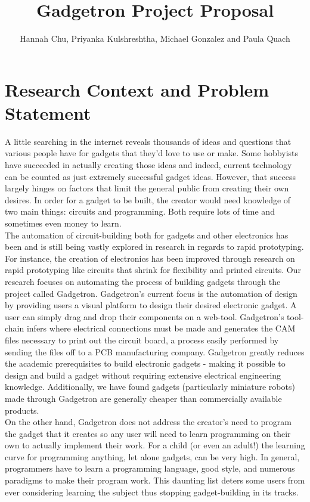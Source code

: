 \documentclass[12pt]{article}
\begin{document}
\author{Hannah Chu, Priyanka Kulshreshtha, Michael Gonzalez and Paula Quach}
\title{Gadgetron Project Proposal}
\maketitle

\section{Research Context and Problem Statement}
A little searching in the internet reveals thousands of ideas and questions that various people have for gadgets that they'd love to use or make. Some hobbyists have succeeded in actually creating those ideas and indeed, current technology can be counted as just extremely successful gadget ideas. However, that success largely hinges on factors that limit the general public from creating their own desires. In order for a gadget to be built, the creator would need knowledge of two main things: circuits and programming. Both require lots of time and sometimes even money to learn.\\[7pt]
The automation of circuit-building both for gadgets and other electronics has been and is still being vastly explored in research in regards to rapid prototyping. For instance, the creation of electronics has been improved through research on rapid prototyping like circuits that shrink for flexibility\cite{shrinky} and printed circuits\cite{inkjets}. Our research focuses on automating the process of building gadgets through the project called Gadgetron. Gadgetron's current focus is the automation of design by providing users a visual platform to design their desired electronic gadget. A user can simply drag and drop their components on a web-tool. Gadgetron's tool-chain infers where electrical connections must be made and generates the CAM files necessary to print out the circuit board, a process easily performed by sending the files off to a PCB manufacturing company. Gadgetron greatly reduces the academic prerequisites to build electronic gadgets - making it possible to design and build a gadget without requiring extensive electrical engineering knowledge. Additionally, we have found gadgets (particularly miniature robots) made through Gadgetron are generally cheaper than commercially available products.\\[7pt]
On the other hand, Gadgetron does not address the creator's need to program the gadget that it creates so any user will need to learn programming on their own to actually implement their work. For a child (or even an adult!) the learning curve for programming anything, let alone gadgets, can be very high. In general, programmers have to learn a programming language, good style, and numerous paradigms to make their program work. This daunting list deters some users from ever considering learning the subject thus stopping gadget-building in its tracks. 
\end{document}
